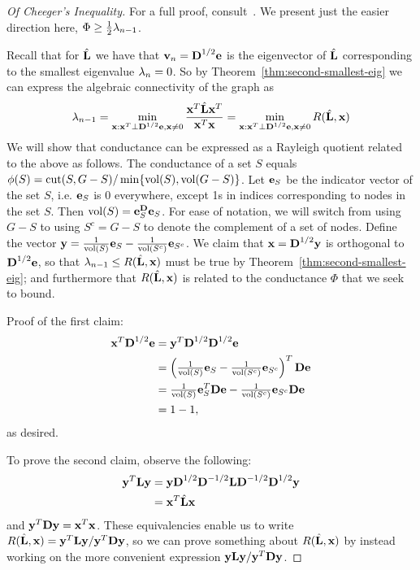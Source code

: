  \begin{proof}[Of Cheeger's Inequality]
   For a full proof, consult~\cite{chung1997spectral}. We present just the easier direction here, $\Phi \geq \tfrac{1}{2}\lambda_{n-1}$.

   Recall that for $\hat{\textbf{L}}$ we have that $\textbf{v}_n = \textbf{D}^{1/2}\textbf{e}$ is the eigenvector of $\hat{\textbf{L}}$ corresponding to the smallest eigenvalue $\lambda_n = 0$.
   So by Theorem~\ref{thm:second-smallest-eig} we can express the algebraic connectivity of the graph as
   \[
   \lambda_{n-1} = \min_{ \textbf{x}: \textbf{x}^T \perp \textbf{D}^{1/2}\textbf{e} , \textbf{x} \neq 0} \frac{\textbf{x}^T \hat{\textbf{L}} \textbf{x}^T}{\textbf{x}^T\textbf{x}}  = \min_{ \textbf{x}: \textbf{x}^T \perp \textbf{D}^{1/2}\textbf{e} , \textbf{x} \neq 0} R(\hat{\textbf{L}}, \textbf{x})
   \]
   We will show that conductance can be expressed as a Rayleigh quotient related to the above as follows.
   The conductance of a set $S$ equals $\phi(S) = \operatorname{cut}(S, G-S) /\min\{ \operatorname{vol}(S), \operatorname{vol}(G-S)\} $. Let $\textbf{e}_S$ be the indicator vector of the set $S$, i.e. $\textbf{e}_S$ is 0 everywhere, except 1s in indices corresponding to nodes in the set $S$. Then $\operatorname{vol}(S) = \textbf{e}_S^ {\textbf{D}} \textbf{e}_S$. For ease of notation, we will switch from using $G-S$ to using $S^c = G-S$ to denote the complement of a set of nodes.
   Define the vector $\textbf{y} = \tfrac{1}{\operatorname{vol}(S)} \textbf{e}_S - \tfrac{1}{\operatorname{vol}(S^c)} \textbf{e}_{S^c}$.
   We claim that $\textbf{x} = \textbf{D}^{1/2}\textbf{y}$ is orthogonal to $\textbf{D}^{1/2}\textbf{e}$, so that $\lambda_{n-1} \leq R(\hat{\textbf{L}},\textbf{x})$ must be true by Theorem~\ref{thm:second-smallest-eig}; and furthermore that $R(\hat{\textbf{L}},\textbf{x})$ is related to the conductance $\Phi$ that we seek to bound.

   Proof of the first claim:
   \begin{align}
     \textbf{x}^T\textbf{D}^{1/2}\textbf{e} &= \textbf{y}^T \textbf{D}^{1/2} \textbf{D}^{1/2} \textbf{e} \\
     &= \left( \tfrac{1}{\operatorname{vol}(S)} \textbf{e}_S - \tfrac{1}{\operatorname{vol}(S^c)} \textbf{e}_{S^c} \right)^T \textbf{D}\textbf{e} \\
     &= \tfrac{1}{\operatorname{vol}(S)}  \textbf{e}_S^T \textbf{D}\textbf{e}  - \tfrac{1}{\operatorname{vol}(S^c)} \textbf{e}_{S^c} \textbf{D}\textbf{e} \\
     &= 1 - 1,
   \end{align}
as desired.

To prove the second claim, observe the following:
\begin{align}
  \textbf{y}^T \textbf{L} \textbf{y} &= \textbf{y} \textbf{D}^{1/2} \textbf{D}^{-1/2} \textbf{L} \textbf{D}^{-1/2} \textbf{D}^{1/2} \textbf{y} \\
  &= \textbf{x}^T \hat{\textbf{L}} \textbf{x}
\end{align}
and $\textbf{y}^T\textbf{D}\textbf{y} = \textbf{x}^T\textbf{x}$. These equivalencies enable us to write $R(\hat{\textbf{L}},\textbf{x}) = \textbf{y}^T \textbf{L} \textbf{y} / \textbf{y}^T\textbf{D}\textbf{y}$, so we can prove something about $R(\hat{\textbf{L}},\textbf{x})$ by instead working on the more convenient expression $\textbf{y}\textbf{L}\textbf{y} / \textbf{y}^T\textbf{D}\textbf{y}$.


\end{proof}
